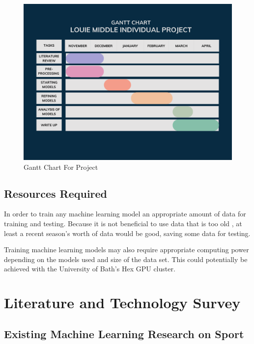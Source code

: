\documentclass[12pt,a4paper]{report}
\theoremstyle{definition}
\begin{document}
\begin{figure}[H]
    \centering
    \includegraphics[width=\linewidth]{Gantt Chart.png}
    \caption{Gantt Chart For Project}
    \label{fig:gantt_chart}
\end{figure}

\section{Resources Required}

In order to train any machine learning model an appropriate amount of data for training and testing. 
Because it is not beneficial to use data that is too old \citep{horvat2020}, at least a recent season's worth of data would be good, saving some data for testing. 

Training machine learning models may also require appropriate computing power depending on the models used and size of the data set. 
This could potentially be achieved with the University of Bath's Hex GPU cluster.

\chapter{Literature and Technology Survey}

\section{Existing Machine Learning Research on Sport}
\end{document}
